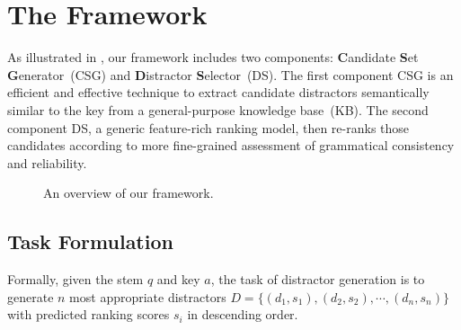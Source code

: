 \section{The Framework}
\label{sec:method}
As illustrated in , our framework includes two 
components: \textbf{C}andidate \textbf{S}et \textbf{G}enerator~(CSG) and \textbf{D}istractor \textbf{S}elector~(DS). The first component CSG is 
an efficient and effective technique to extract candidate distractors semantically similar to the key from a general-purpose knowledge base~(KB). The second component DS, a generic feature-rich ranking model, then re-ranks those candidates according to more fine-grained assessment of grammatical consistency and reliability.
\begin{figure}[th!]
\centering
{}
\caption{An overview of our framework.} \label{fig:framework}
\end{figure}

\subsection{Task Formulation}
Formally, given the stem $q$ and key $a$, the task of distractor generation is to generate $n$ most 
appropriate distractors $D = \{(d_1, s_1), (d_2, s_2), \cdots, (d_n, s_n) \}$ with predicted ranking scores $s_i$ in descending order. 

